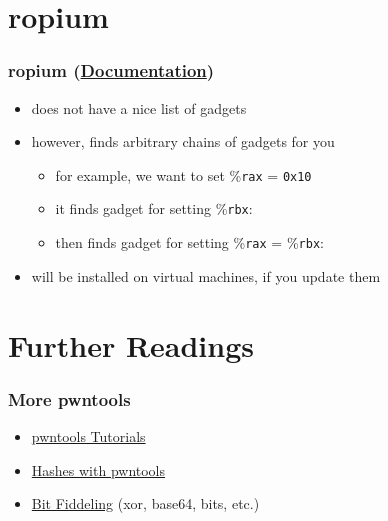 \documentclass[aspectratio=169]{beamer}
\newcommand{\reg}[1]{\%\texttt{#1}}
\newcommand{\hex}[1]{\texttt{0x#1}}
\newcommand{\docl}[1]{(\textbf{\href{#1}{Documentation}})}
\begin{document}
\section{ropium}
\begin{frame}[fragile]
    \frametitle{ropium \docl{https://github.com/Boyan-MILANOV/ropium\#getting-started}}
    \begin{itemize}
        \item does not have a nice list of gadgets
        \item however, finds arbitrary chains of gadgets for you
        \begin{itemize}
            \item for example, we want to set \reg{rax} = \hex{10}
            \item it finds gadget for setting \reg{rbx}: 
            \item then finds gadget for setting \reg{rax} = \reg{rbx}: 
        \end{itemize}
        \item will be installed on virtual machines, if you update them
    \end{itemize}

\end{frame}

\section{Further Readings}
\begin{frame}[fragile]
    \frametitle{More pwntools}
    \begin{itemize}
        \item \href{https://github.com/Gallopsled/pwntools-tutorial}{pwntools Tutorials}
        \item \href{http://docs.pwntools.com/en/stable/util/hashes.html}{Hashes with pwntools}
        \item \href{http://docs.pwntools.com/en/stable/util/fiddling.html}{Bit Fiddeling} (xor, base64, bits, etc.)
    \end{itemize}
\end{frame}
\end{document}
